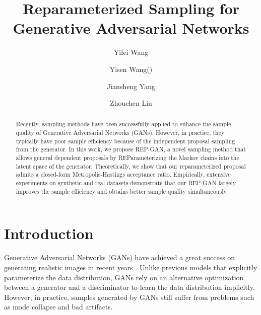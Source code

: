 \documentclass[runningheads]{llncs}
\newcommand{\<}{\left\langle}
\renewcommand{\>}{\right\rangle}
\begin{document}
\title{Reparameterized Sampling for Generative Adversarial Networks}

\author{Yifei Wang
\and
Yisen Wang\footnotemark[1](\Letter)
\and
Jiansheng Yang
\and
Zhouchen Lin
}




\maketitle

\renewcommand{\thefootnote}{\fnsymbol{footnote}} 

\begin{abstract}
Recently, sampling methods have been successfully applied to enhance the sample quality of Generative Adversarial Networks (GANs). However, in practice, they typically have poor sample efficiency because of the independent proposal sampling from the generator. 
In this work, we propose REP-GAN, a novel sampling method that allows general dependent proposals by REParameterizing the Markov chains
into the latent space of the generator.
Theoretically, we show that our reparameterized proposal admits a closed-form Metropolis-Hastings acceptance ratio.
Empirically, extensive experiments on synthetic and real datasets demonstrate that our REP-GAN largely improves the sample efficiency and obtains better sample quality simultaneously.
\end{abstract}

\section{Introduction}

Generative Adversarial Networks (GANs) \cite{goodfellow2014generative} have achieved a great success on generating realistic images in recent years \cite{karras2019style,brock2018large}. Unlike previous models that explicitly parameterize the data distribution, GANs rely on an alternative optimization between a generator and a discriminator to learn the data distribution implicitly. However, in practice, samples generated by GANs still suffer from problems such as mode collapse and bad artifacts. 
\end{document}
